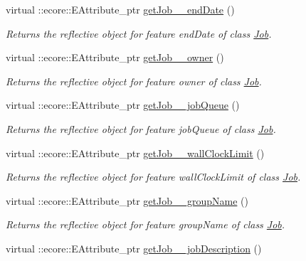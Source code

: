 \begin{DoxyCompactItemize}
virtual ::ecore::EAttribute\_\-ptr \hyperlink{classTMS__Data_1_1TMS__DataPackage_a8d506dcdac769854ff27b62dd285bde2}{getJob\_\-\_\-endDate} ()
\begin{DoxyCompactList}\small\item\em Returns the reflective object for feature endDate of class \hyperlink{classTMS__Data_1_1Job}{Job}. \item\end{DoxyCompactList}\item 
virtual ::ecore::EAttribute\_\-ptr \hyperlink{classTMS__Data_1_1TMS__DataPackage_aaf6a18b7727b10f6d5dcd25fdb367108}{getJob\_\-\_\-owner} ()
\begin{DoxyCompactList}\small\item\em Returns the reflective object for feature owner of class \hyperlink{classTMS__Data_1_1Job}{Job}. \item\end{DoxyCompactList}\item 
virtual ::ecore::EAttribute\_\-ptr \hyperlink{classTMS__Data_1_1TMS__DataPackage_ae5fd81a12c4754019060b6d4323264e3}{getJob\_\-\_\-jobQueue} ()
\begin{DoxyCompactList}\small\item\em Returns the reflective object for feature jobQueue of class \hyperlink{classTMS__Data_1_1Job}{Job}. \item\end{DoxyCompactList}\item 
virtual ::ecore::EAttribute\_\-ptr \hyperlink{classTMS__Data_1_1TMS__DataPackage_aaa45d3f269cb449a1b7843b311116e8d}{getJob\_\-\_\-wallClockLimit} ()
\begin{DoxyCompactList}\small\item\em Returns the reflective object for feature wallClockLimit of class \hyperlink{classTMS__Data_1_1Job}{Job}. \item\end{DoxyCompactList}\item 
virtual ::ecore::EAttribute\_\-ptr \hyperlink{classTMS__Data_1_1TMS__DataPackage_ac6ae3b167ac27bad0f25ad9dfb69e349}{getJob\_\-\_\-groupName} ()
\begin{DoxyCompactList}\small\item\em Returns the reflective object for feature groupName of class \hyperlink{classTMS__Data_1_1Job}{Job}. \item\end{DoxyCompactList}\item 
virtual ::ecore::EAttribute\_\-ptr \hyperlink{classTMS__Data_1_1TMS__DataPackage_a5f193627148da47c55ebecd347efb8cb}{getJob\_\-\_\-jobDescription} ()

\end{DoxyCompactItemize}
